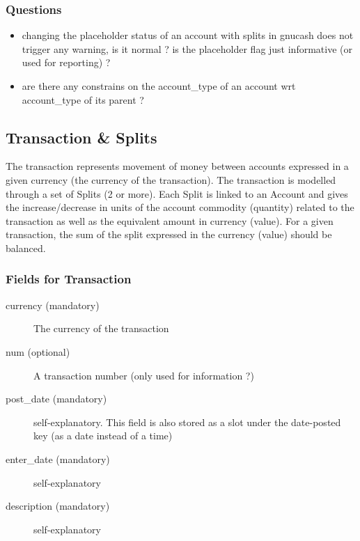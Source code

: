 \documentclass[letterpaper,10pt,english]{sphinxmanual}
\begin{document}
\subsubsection{Questions}
\label{object_model:id6}\begin{itemize}
\item {} 
changing the placeholder status of an account with splits in gnucash does not trigger any warning, is it normal ?
is the placeholder flag just informative (or used for reporting)  ?

\item {} 
are there any constrains on the account\_type of an account wrt account\_type of its parent ?

\end{itemize}
\label{object_model:transaction}

\subsection{Transaction \& Splits}
\label{object_model:transaction-splits}\label{object_model:split}\label{object_model:transaction}
The transaction represents movement of money between accounts expressed in a given currency (the currency of the transaction).
The transaction is modelled through a set of Splits (2 or more).
Each Split is linked to an Account and gives the increase/decrease in units of the account commodity (quantity)
related to the transaction as well as the equivalent amount in currency (value).
For a given transaction, the sum of the split expressed in the currency (value) should be balanced.


\subsubsection{Fields for Transaction}
\label{object_model:fields-for-transaction}\begin{description}
\item[{currency (mandatory)}] \leavevmode
The currency of the transaction

\item[{num (optional)}] \leavevmode
A transaction number (only used for information ?)

\item[{post\_date (mandatory)}] \leavevmode
self-explanatory. This field is also stored as a slot under the date-posted key (as a date instead of a time)

\item[{enter\_date (mandatory)}] \leavevmode
self-explanatory

\item[{description (mandatory)}] \leavevmode
self-explanatory

\end{description}
\end{document}
